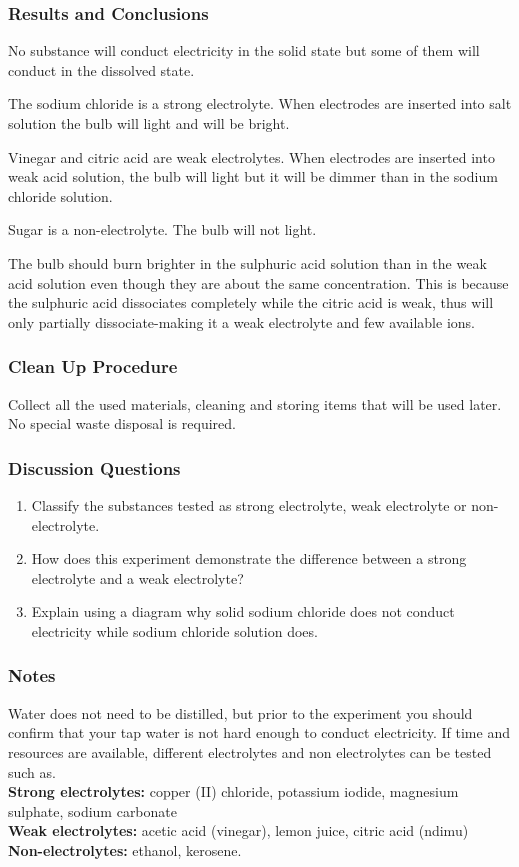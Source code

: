 \subsubsection*{Results and Conclusions}
No substance will conduct electricity in the solid state but some of them will conduct in the dissolved state.

The sodium chloride is a strong electrolyte. When electrodes are inserted into salt solution the bulb will light and will be bright.

Vinegar and citric acid are weak electrolytes. When electrodes are inserted into weak acid solution, the bulb will light but it will be dimmer than in the sodium chloride solution.

Sugar is a non-electrolyte. The bulb will not light.

The bulb should burn brighter in the sulphuric acid solution than in the weak acid solution even though they are about the same concentration. This is because the sulphuric acid dissociates completely while the citric acid is weak, thus will only partially dissociate-making it a weak electrolyte and few available ions.

\subsubsection*{Clean Up Procedure}
Collect all the used materials, cleaning and storing items that will be used later. No special waste disposal is required.
\subsubsection*{Discussion Questions}
\begin{enumerate}
\item{Classify the substances tested as strong electrolyte, weak electrolyte or non-electrolyte.}
\item{How does this experiment demonstrate the difference between a strong electrolyte and a weak electrolyte?}
\item{Explain using a diagram why solid sodium chloride does not conduct electricity while sodium chloride solution does.}
\end{enumerate}

\subsubsection*{Notes}
Water does not need to be distilled, but prior to the experiment you should confirm that your tap water is not hard enough to conduct electricity.
If time and resources are available, different electrolytes and non electrolytes can be tested such as.\\
\textbf{Strong electrolytes:} copper (II) chloride, potassium iodide, magnesium sulphate, sodium carbonate\\
\textbf{Weak electrolytes:} acetic acid (vinegar), lemon juice, citric acid (ndimu)\\
\textbf{Non-electrolytes:} ethanol, kerosene.

